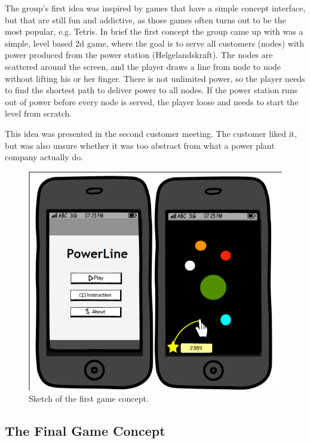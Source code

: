 The group's first idea was inspired by games that have a simple concept interface, but that are still fun and addictive, as those games often turns out to be the most popular, e.g. Tetris. In brief the first concept the group came up with was a simple, level based 2d game, where the goal is to serve all customers (nodes) with power produced from the power station
(Helgelandskraft). The nodes are scattered around the screen, and the player draws a line from node to node without lifting his or her finger. There is not unlimited power, so the player needs to find the shortest path to deliver
power to all nodes. If the power station runs out of power before every node is served, the player loose and needs to start the level from scratch.

This idea was presented in the second customer meeting. The customer liked it, but was also unsure whether it was too abstract from what a power plant company actually do. 

\begin{figure}
	\center
	\includegraphics[scale=0.75]{pictures/Skisse}
	\caption{Sketch of the first game concept.}
\end{figure}

\subsection{The Final Game Concept}

